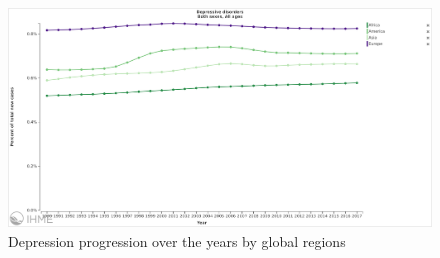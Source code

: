 \documentclass[11pt, notitlepage]{article} %
\begin{document}
\appendix
\begin{figure}
	\centering
	\includegraphics[scale=.24]{Figures/depressionprogression.png}
	\caption{Depression progression over the years by global regions} 
	\label{fig:depressionmap}
\end{figure}
\end{document}
